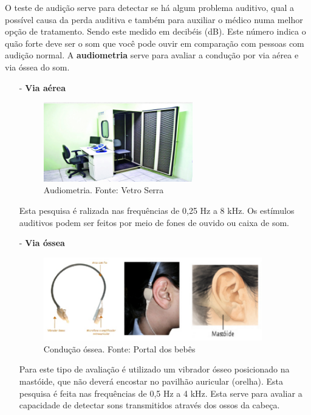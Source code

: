 \documentclass[brasil]{abnt}
\begin{document}
	O teste de audição serve para detectar se há algum problema auditivo, qual a possível causa da perda auditiva e também para auxiliar o médico numa melhor opção de tratamento.
	Sendo este medido em decibéis (dB). Este número indica o quão forte deve ser o som que você pode ouvir em comparação com pessoas com audição normal. A \textbf{audiometria} serve para avaliar 
	a condução por via aérea e via óssea do som.
				
		\begin{itemize}
		
			\item [-] \textbf{Via aérea}
				\begin{figure}[!htb]
					\center
					\includegraphics[width=65mm]{ava.png}
					\caption{Audiometria. Fonte: Vetro Serra}
				\end{figure}
					
			Esta pesquisa é ralizada nas frequências de 0,25 Hz a 8 kHz. Os estímulos auditivos podem ser feitos por meio de fones de ouvido ou caixa de som. 

			\item [-] \textbf{Via óssea}
				\begin{figure}[!htb]
					\center
					\includegraphics[width=95mm]{mvo.png}
					\caption{Condução óssea. Fonte: Portal dos bebês}
				\end{figure}
											
			Para este tipo de avaliação é utilizado um vibrador ósseo posicionado na mastóide, que não deverá encostar no pavilhão auricular (orelha). Esta pesquisa é feita nas frequências de 0,5 Hz a 4 kHz. Esta serve para avaliar a capacidade de detectar 
			sons transmitidos através dos ossos da cabeça.
					
		\end{itemize}			
    
\end{document}
